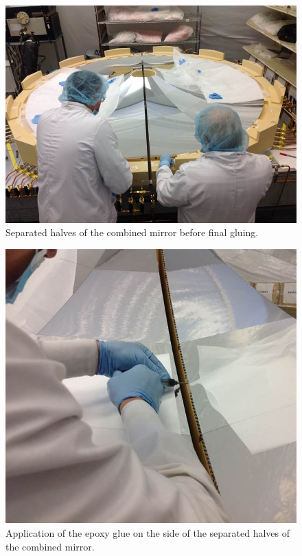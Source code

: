  \begin{figure}[ht]
    \centering
    \includegraphics[width=1.0\linewidth]{images/Separated_halves.jpg}
    \caption{Separated halves of the combined mirror before final gluing.}
    \label{fig:Separated_halves}
\end{figure}
         
 
   \begin{figure}[ht]
    \centering
    \includegraphics[width=1.0\linewidth]{images/Final_Gluing.jpg}
    \caption{Application of the epoxy glue on the side of the separated halves of the combined mirror.}
    \label{fig:Final_Gluing}
\end{figure}
  
